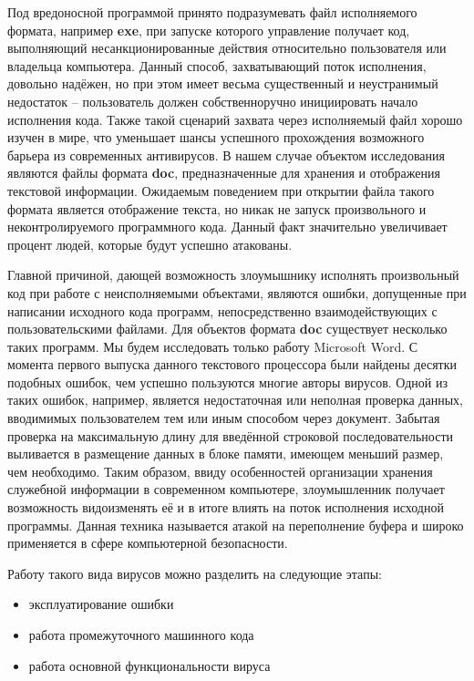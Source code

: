 Под вредоносной программой принято подразумевать файл исполняемого формата, например \textbf{exe}, при запуске которого управление получает код, выполняющий несанкционированные действия относительно пользователя или владельца компьютера. 
Данный способ, захватывающий поток исполнения, довольно надёжен, но при этом имеет весьма существенный и неустранимый недостаток -- пользователь должен собственноручно инициировать начало исполнения кода.
Также такой сценарий захвата через исполняемый файл хорошо изучен в мире, что уменьшает шансы успешного прохождения возможного барьера из современных антивирусов.
В нашем случае объектом исследования являются файлы формата \textbf{doc}, предназначенные для хранения и отображения текстовой информации. 
Ожидаемым поведением при открытии файла такого формата является отображение текста, но никак не запуск произвольного и неконтролируемого программного кода.
Данный факт значительно увеличивает процент людей, которые будут успешно атакованы.

Главной причиной, дающей возможность злоумышнику исполнять произвольный код при работе с неисполняемыми объектами, являются ошибки, допущенные при написании исходного кода программ, непосредственно взаимодействующих с пользовательскими файлами. 
Для объектов формата \textbf{doc} существует несколько таких программ.
Мы будем исследовать только работу Microsoft Word.
С момента первого выпуска данного текстового процессора были найдены десятки подобных ошибок, чем успешно пользуются многие авторы вирусов.
Одной из таких ошибок, например, является недостаточная или неполная проверка данных, вводимимых пользователем тем или иным способом через документ.
Забытая проверка на максимальную длину для введённой строковой последовательности выливается в размещение данных в блоке памяти, имеющем меньший размер, чем необходимо. 
Таким образом, ввиду особенностей организации хранения служебной информации в современном компьютере, злоумышленник получает возможность видоизменять её и в итоге влиять на поток исполнения исходной программы.
Данная техника называется атакой на переполнение буфера и широко применяется в сфере компьютерной безопасности.

Работу такого вида вирусов можно разделить на следующие этапы:

\begin{itemize}
\item эксплуатирование ошибки
\item работа промежуточного машинного кода
\item работа основной функциональности вируса
\end{itemize}

